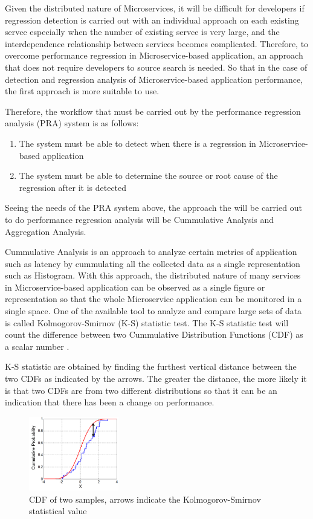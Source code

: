 \documentclass[conference]{configs/IEEEtran}
\begin{document}
Given the distributed nature of Microservices, it will be difficult for developers if regression detection is carried out with an individual approach on each existing servce especially when the number of existing servce is very large, and the interdependence relationship between services becomes complicated. Therefore, to overcome performance regression in Microservice-based application, an approach that does not require developers to source search is needed. So that in the case of detection and regression analysis of Microservice-based application performance, the first approach is more suitable to use.

Therefore, the workflow that must be carried out by the performance regression analysis (PRA) system is as follows:
\begin{enumerate}
	\item The system must be able to detect when there is a regression in Microservice-based application
	\item The system must be able to determine the source or root cause of the regression after it is detected
\end{enumerate}

Seeing the needs of the PRA system above, the approach the will be carried out to do performance regression analysis will be Cummulative Analysis and Aggregation Analysis. 

Cummulative Analysis is an approach to analyze certain metrics of application such as latency by cummulating all the collected data as a single representation such as Histogram. With this approach, the distributed nature of many services in Microservice-based application can be observed as a single figure or representation so that the whole Microservice application can be monitored in a single space. One of the available tool to analyze and compare large sets of data is called Kolmogorov-Smirnov (K-S) statistic test. The K-S statistic test will count the difference between two Cummulative Distribution Functions (CDF) as a scalar number \cite{kolmogorov_1951}.

K-S statistic are obtained by finding the furthest vertical distance between the two CDFs as indicated by the arrows. The greater the distance, the more likely it is that two CDFs are from two different distributions so that it can be an indication that there has been a change on performance.
\begin{figure}[htb]
	\centering
	\includegraphics[width=0.35\textwidth]{resources/ch2/ks.png}
	\caption{CDF of two samples, arrows indicate the Kolmogorov-Smirnov statistical value \cite{wiki:ks-test}}
	\label{ks-example}
\end{figure}
\end{document}
